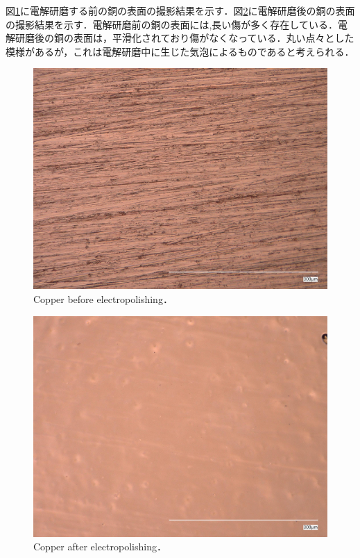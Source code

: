 図\ref{fig:Cu}に電解研磨する前の銅の表面の撮影結果を示す．図\ref{fig:Cuele}に電解研磨後の銅の表面の撮影結果を示す．電解研磨前の銅の表面には,長い傷が多く存在している．電解研磨後の銅の表面は，平滑化されており傷がなくなっている．丸い点々とした模様があるが，これは電解研磨中に生じた気泡によるものであると考えられる．
\begin{figure}[htbp]
    \centering %
    \includegraphics[width=100truemm,clip]{fig/241218_Cu_600.jpg}
    \caption{Copper before electropolishing．}
    \label{fig:Cu}
\end{figure}
\begin{figure}[htbp]
    \centering %
    \includegraphics[width=100truemm,clip]{fig/241218_Cu_ele.jpg}
    \caption{Copper after electropolishing．}
    \label{fig:Cuele}
\end{figure}